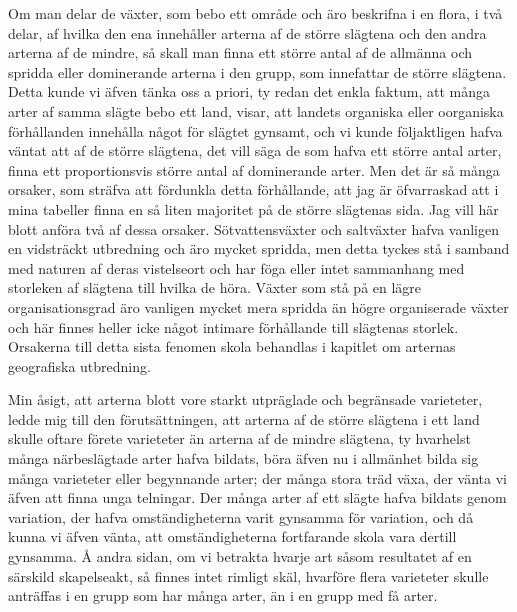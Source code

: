 Om man delar de växter, som bebo ett område och äro beskrifna i en flora, i två delar, af hvilka den ena innehåller arterna af de större slägtena och den andra arterna af de mindre, så skall man finna ett större antal af de allmänna och spridda eller dominerande arterna i den grupp, som innefattar de större slägtena. Detta kunde vi äfven tänka oss a priori, ty redan det enkla faktum, att många arter af samma slägte bebo ett land, visar, att landets organiska eller oorganiska förhållanden innehålla något för slägtet gynsamt, och vi kunde följaktligen hafva väntat att af de större slägtena, det vill säga de som hafva ett större antal arter, finna ett proportionsvis större antal af dominerande arter. Men det är så många orsaker, som sträfva att fördunkla detta förhållande, att jag är öfvarraskad att i mina tabeller finna en så liten majoritet på de större slägtenas sida. Jag vill här blott anföra två af dessa orsaker. Sötvattensväxter och saltväxter hafva vanligen en vidsträckt utbredning och äro mycket spridda, men detta tyckes stå i samband med naturen af deras vistelseort och har föga eller intet sammanhang med storleken af slägtena till hvilka de höra. Växter som stå på en lägre organisationsgrad äro vanligen mycket mera spridda än högre organiserade växter och här finnes heller icke något intimare förhållande till slägtenas storlek. Orsakerna till detta sista fenomen skola behandlas i kapitlet om arternas geografiska utbredning.

Min åsigt, att arterna blott vore starkt utpräglade och begränsade varieteter, ledde mig till den förutsättningen, att arterna af de större slägtena i ett land skulle oftare förete varieteter än arterna af de mindre slägtena, ty hvarhelst många närbeslägtade arter hafva bildats, böra äfven nu i allmänhet bilda sig många varieteter eller begynnande arter; der många stora träd växa, der vänta vi äfven att finna unga telningar. Der många arter af ett slägte hafva bildats genom variation, der hafva omständigheterna varit gynsamma för variation, och då kunna vi äfven vänta, att omständigheterna fortfarande skola vara dertill gynsamma. Å andra sidan, om vi betrakta hvarje art såsom resultatet af en särskild skapelseakt, så finnes intet rimligt skäl, hvarföre flera varieteter skulle anträffas i en grupp som har många arter, än i en grupp med få arter.

